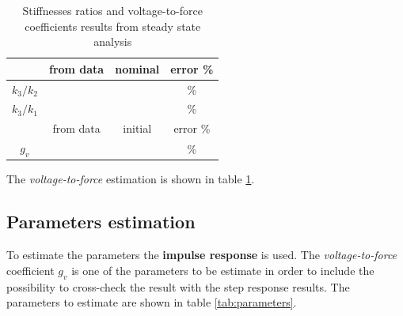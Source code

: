 \documentclass[twosided,a4paper]{article}           %
\begin{document}
\begin{table}[H]
	\centering
	\begin{tabular}{|c|c|c|c|}
		\hline 
		 & from data & nominal & error \% \\ 
		\hline 
		$k_3/k_2$ & &  & \%  \\ 
		\hline 
		$k_3/k_1$ & &  & \% \\
		\hline \hline
		      & from data              & initial & error 
		      \%\\
		\hline
		$g_v$ &  &  & \% \\\hline
	\end{tabular} 
	\label{tab:ratios}
	\caption{Stiffnesses ratios and voltage-to-force coefficients results from steady state analysis}
\end{table}
The \textit{voltage-to-force} estimation is shown in table \ref{tab:ratios}.
\subsection{Parameters estimation}
To estimate the parameters the \textbf{impulse response} is used. The \textit{voltage-to-force} coefficient $g_v$ is one of the parameters to be estimate in order to include the possibility to cross-check the result with the step response results.
The parameters to estimate are shown in table \ref{tab:parameters}.
\end{document}
